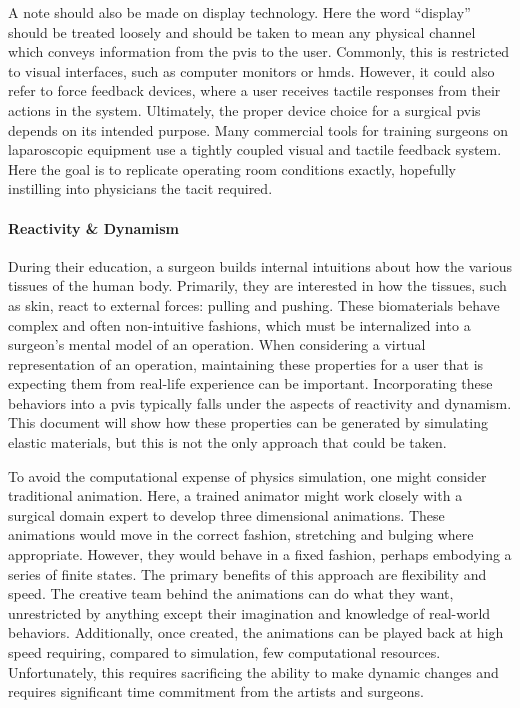 \documentclass[12pt,oneside,letterpaper]{memoir}
\begin{document}
A note should also be made on display technology. Here the word
``display'' should be treated loosely and should be taken to mean any
physical channel which conveys information from the \gls{pvis} to the
user. Commonly, this is restricted to visual interfaces, such as
computer monitors or \glspl{hmd}. However, it could also refer to
force feedback devices, where a user receives tactile responses from
their actions in the system. Ultimately, the proper device choice for
a surgical \gls{pvis} depends on its intended purpose. Many commercial
tools for training surgeons on laparoscopic equipment use a tightly
coupled visual and tactile feedback system. Here the goal is to
replicate operating room conditions exactly, hopefully instilling into
physicians the \gls{tacit} required\cite{TACITKNOWLEDGE}.

\paragraph{Reactivity \& Dynamism} During their education, a surgeon
builds internal intuitions about how the various tissues of the human
body. Primarily, they are interested in how the tissues, such as skin,
react to external forces: pulling and pushing. These biomaterials
behave complex and often non-intuitive fashions, which must be
internalized into a surgeon's mental model of an operation. When
considering a virtual representation of an operation, maintaining
these properties for a user that is expecting them from real-life
experience can be important. Incorporating these behaviors into a
\gls{pvis} typically falls under the aspects of reactivity and
dynamism. This document will show how these properties can be
generated by simulating elastic materials, but this is not the only
approach that could be taken.

To avoid the computational expense of physics simulation, one might
consider traditional animation. Here, a trained animator might work
closely with a surgical domain expert to develop three dimensional
animations. These animations would move in the correct fashion,
stretching and bulging where appropriate. However, they would behave
in a fixed fashion, perhaps embodying a series of finite states. The
primary benefits of this approach are flexibility and speed. The
creative team behind the animations can do what they want,
unrestricted by anything except their imagination and knowledge of
real-world behaviors. Additionally, once created, the animations can
be played back at high speed requiring, compared to simulation, few
computational resources. Unfortunately, this requires sacrificing the
ability to make dynamic changes and requires significant time
commitment from the artists and surgeons.
\end{document}
